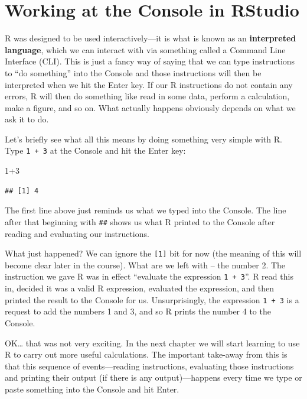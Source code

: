 \documentclass[
]{book}
\newenvironment{Shaded}{\begin{snugshade}}{\end{snugshade}}
\newcommand{\DecValTok}[1]{\textcolor[rgb]{0.00,0.00,0.81}{#1}}
\newcommand{\SpecialCharTok}[1]{\textcolor[rgb]{0.00,0.00,0.00}{#1}}
\begin{document}
\hypertarget{working-at-console}{%
\section*{Working at the Console in RStudio}\label{working-at-console}}

R was designed to be used interactively---it is what is known as an \textbf{interpreted language}, which we can interact with via something called a Command Line Interface (CLI). This is just a fancy way of saying that we can type instructions to ``do something'' into the Console and those instructions will then be interpreted when we hit the Enter key. If our R instructions do not contain any errors, R will then do something like read in some data, perform a calculation, make a figure, and so on. What actually happens obviously depends on what we ask it to do.

Let's briefly see what all this means by doing something very simple with R. Type \texttt{1\ +\ 3} at the Console and hit the Enter key:

\begin{Shaded}
\begin{Highlighting}[]
\DecValTok{1}\SpecialCharTok{+}\DecValTok{3}
\end{Highlighting}
\end{Shaded}

\begin{verbatim}
## [1] 4
\end{verbatim}

The first line above just reminds us what we typed into the Console. The line after that beginning with \texttt{\#\#} shows us what R printed to the Console after reading and evaluating our instructions.

What just happened? We can ignore the \texttt{{[}1{]}} bit for now (the meaning of this will become clear later in the course). What are we left with -- the number 2. The instruction we gave R was in effect ``evaluate the expression \texttt{1\ +\ 3}''. R read this in, decided it was a valid R expression, evaluated the expression, and then printed the result to the Console for us. Unsurprisingly, the expression \texttt{1\ +\ 3} is a request to add the numbers 1 and 3, and so R prints the number 4 to the Console.

OK\ldots{} that was not very exciting. In the next chapter we will start learning to use R to carry out more useful calculations. The important take-away from this is that this sequence of events---reading instructions, evaluating those instructions and printing their output (if there is any output)---happens every time we type or paste something into the Console and hit Enter.
\end{document}
